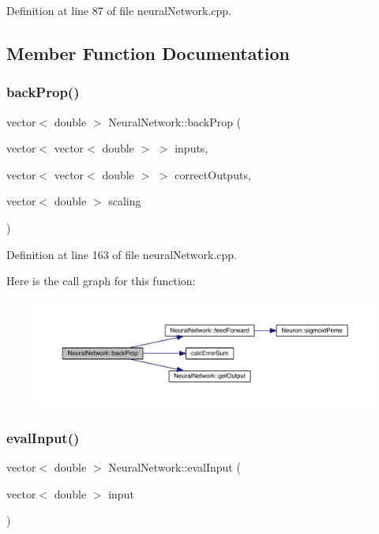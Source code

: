 Definition at line 87 of file neural\+Network.\+cpp.



\subsection{Member Function Documentation}
\mbox{\label{class_neural_network_a4416dadd62ac5ec1b645ae1378e21335}} 
\subsubsection{\texorpdfstring{back\+Prop()}{backProp()}}
{\footnotesize\ttfamily vector$<$ double $>$ Neural\+Network\+::back\+Prop (\begin{DoxyParamCaption}\item[{vector$<$ vector$<$ double $>$ $>$}]{inputs,  }\item[{vector$<$ vector$<$ double $>$ $>$}]{correct\+Outputs,  }\item[{vector$<$ double $>$}]{scaling }\end{DoxyParamCaption})}



Definition at line 163 of file neural\+Network.\+cpp.

Here is the call graph for this function\+:\nopagebreak
\begin{figure}[H]
\begin{center}
\leavevmode
\includegraphics[width=350pt]{class_neural_network_a4416dadd62ac5ec1b645ae1378e21335_cgraph}
\end{center}
\end{figure}
\mbox{\label{class_neural_network_a7566cd3df29d6ed6d8134d2c52c1460a}} 
\subsubsection{\texorpdfstring{eval\+Input()}{evalInput()}}
{\footnotesize\ttfamily vector$<$ double $>$ Neural\+Network\+::eval\+Input (\begin{DoxyParamCaption}\item[{vector$<$ double $>$}]{input }\end{DoxyParamCaption})}




